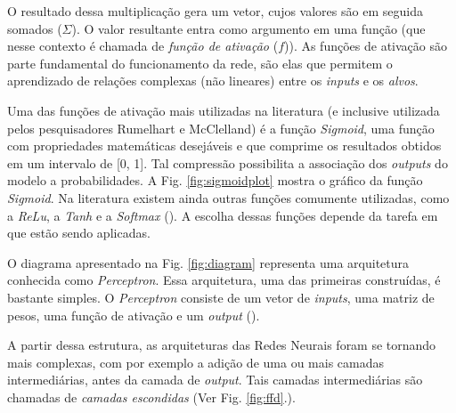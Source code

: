   

O resultado dessa multiplicação gera um vetor, cujos valores são em seguida somados ($\displaystyle\Sigma$). O valor resultante entra como argumento em uma função (que nesse contexto é chamada de \textit{função de ativação} ($f$)). As funções de ativação são parte fundamental do funcionamento da rede, são elas que permitem o aprendizado de relações complexas (não lineares) entre os \textit{inputs} e os \textit{alvos}. 

Uma das funções de ativação mais utilizadas na literatura (e inclusive utilizada pelos pesquisadores Rumelhart e McClelland) é a função \textit{Sigmoid}, uma função com propriedades matemáticas desejáveis e que comprime os resultados obtidos em um intervalo de [0, 1]. Tal compressão possibilita a associação dos \textit{outputs} do modelo a probabilidades. A Fig. \ref{fig:sigmoidplot} mostra o gráfico da função \textit{Sigmoid}. Na literatura existem ainda outras funções comumente utilizadas, como a \textit{ReLu}, a \textit{Tanh} e a \textit{Softmax}
(\cite{Goodfellow-et-al-2016}). A escolha dessas funções depende da tarefa em que estão sendo aplicadas. 


 O diagrama apresentado na Fig. \ref{fig:diagram} representa uma arquitetura conhecida como \textit{Perceptron}. Essa arquitetura, uma das primeiras construídas, é bastante simples. O \textit{Perceptron} consiste de um vetor de \textit{inputs}, uma matriz de pesos, uma função de ativação e um \textit{output} (\cite{Rosenblatt:1957}). 
 
 A partir dessa estrutura, as arquiteturas das Redes Neurais foram se tornando mais complexas, com por exemplo a adição de uma ou mais camadas intermediárias, antes da camada de \textit{output}. Tais camadas intermediárias são chamadas de \textit{camadas escondidas} (Ver Fig. \ref{fig:ffd}.).




